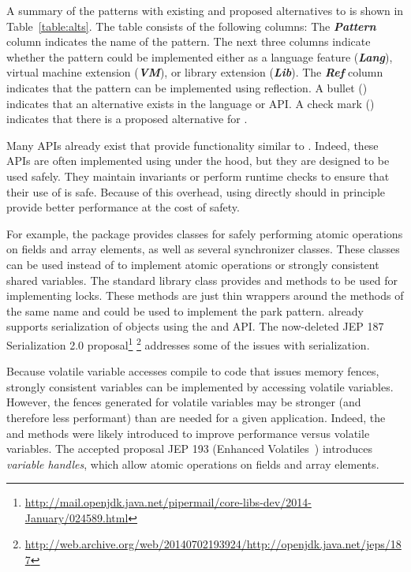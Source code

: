 A summary of the patterns with existing and proposed alternatives to \unsafe{} is shown in Table~\ref{table:alts}.
The table consists of the following columns:
The \textbf{\em Pattern} column indicates the name of the pattern.
The next three columns indicate whether the pattern could be implemented either as a
language feature (\textbf{\em Lang}),
virtual machine extension (\textbf{\em VM}),
or
library extension (\textbf{\em Lib}).
The \textbf{\em Ref} column indicates that the pattern can be
implemented using reflection.
A bullet (\exis) indicates that an
alternative exists in the \java{} language or API. A check mark (\tick)
indicates that there is a proposed alternative for \java{}.

Many \java{} APIs already exist that provide functionality similar to \unsafe{}.
Indeed, these APIs are often implemented using \unsafe{} under the hood, but 
they are designed to be used safely.
They maintain invariants or perform runtime checks
to ensure that their use of \unsafe{} is safe.
Because of this overhead, using \unsafe{}
directly should in principle provide better performance at the cost of safety.

For example,
the  package provides classes 
for safely performing atomic operations on fields and array elements, as well
as several synchronizer classes. These
classes
can be used instead of \unsafe{} to implement
atomic operations or strongly consistent
shared variables.
The standard library class
 provides
 and 
methods to be used for implementing locks. 
These methods are just thin wrappers
around the \smu{} methods of the same name and 
could be used to implement the park pattern.
\java{} already supports serialization of objects using the
 and
 API.
The now-deleted JEP 187 Serialization 2.0 proposal\footnote{\url{http://mail.openjdk.java.net/pipermail/core-libs-dev/2014-January/024589.html}}
\footnote{\url{http://web.archive.org/web/20140702193924/http://openjdk.java.net/jeps/187}}
addresses some of the issues with \java{} serialization.

Because volatile variable accesses compile to code that issues memory fences, 
strongly consistent variables can be implemented by accessing volatile variables.
However, the fences generated for volatile variables may be stronger (and
therefore less performant) than are needed for a given application.
Indeed, the \unsafe{} 
and  methods were likely introduced
to improve performance versus volatile variables.
The accepted proposal JEP 193 (Enhanced Volatiles~\citep{jep193}) introduces \emph{variable handles}, which allow
atomic operations on fields and array elements.

